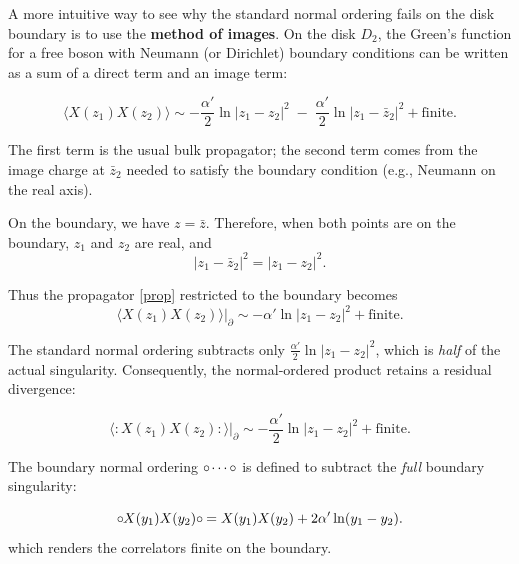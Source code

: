 \begin{tcolorbox}[breakable]
	\begin{remark}
A more intuitive way to see why the standard normal ordering fails on the disk boundary is to use the \textbf{method of images}. On the disk \(D_2\), the Green's function for a free boson with Neumann (or Dirichlet) boundary conditions can be written as a sum of a direct term and an image term:

\begin{equation}
	\langle X(z_1) X(z_2) \rangle \sim -\frac{\alpha'}{2} \ln |z_1 - z_2|^2 \;-\; \frac{\alpha'}{2} \ln |z_1 - \bar{z}_2|^2 + \text{finite}.\label{prop}
\end{equation}

The first term is the usual bulk propagator; the second term comes from the image charge at \(\bar{z}_2\) needed to satisfy the boundary condition (e.g., Neumann on the real axis). 

On the boundary, we have \(z = \bar{z}\). Therefore, when both points are on the boundary, \(z_1\) and \(z_2\) are real, and
\begin{equation}
	|z_1 - \bar{z}_2|^2 = |z_1 - z_2|^2.
\end{equation}

Thus the propagator \eqref{prop} restricted to the boundary becomes
\begin{equation}
	\langle X(z_1) X(z_2) \rangle \big|_{\partial} \sim -\alpha' \ln |z_1 - z_2|^2 + \text{finite}.
\end{equation}

The standard normal ordering subtracts only \(\frac{\alpha'}{2} \ln |z_1 - z_2|^2\), which is \emph{half} of the actual singularity. Consequently, the normal‑ordered product retains a residual divergence:

\begin{equation}
	\langle :X(z_1)X(z_2): \rangle \big|_{\partial} \sim -\frac{\alpha'}{2} \ln |z_1 - z_2|^2 + \text{finite}.
\end{equation}

The boundary normal ordering \(\circ\mkern-1mu \cdots \circ\mkern-1mu\) is defined to subtract the \emph{full} boundary singularity:

\begin{equation}
	\circ\mkern-1mu X(y_1) X(y_2) \circ\mkern-1mu = X(y_1) X(y_2) + 2\alpha' \ln(y_1 - y_2).
\end{equation}
which renders the correlators finite on the boundary.
\end{remark}
\end{tcolorbox}
